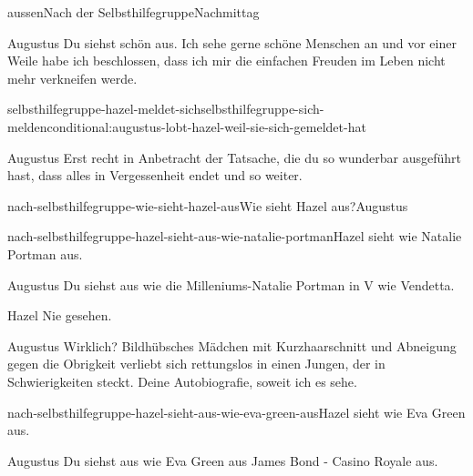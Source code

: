 \documentclass[12pt]{article}
\begin{document}
\begin{scene}[cut to]{aussen}{Nach der Selbsthilfegruppe}{Nachmittag}
        \begin{dialog}{Augustus}
            Du siehst schön aus.
            Ich sehe gerne schöne Menschen an und vor einer Weile habe ich beschlossen, dass ich mir die einfachen Freuden im Leben nicht mehr verkneifen werde.
        \end{dialog}


        \begin{conditional}{selbsthilfegruppe-hazel-meldet-sich}{selbsthilfegruppe-sich-melden}{conditional:augustus-lobt-hazel-weil-sie-sich-gemeldet-hat}
            \begin{dialog}{Augustus}
                Erst recht in Anbetracht der Tatsache, die du so wunderbar ausgeführt hast, dass alles in Vergessenheit endet und so weiter.
            \end{dialog}
        \end{conditional}

        \begin{decision}{nach-selbsthilfegruppe-wie-sieht-hazel-aus}{Wie sieht \gls{Hazel} aus?}{\gls{Augustus}}
            \begin{option}{nach-selbsthilfegruppe-hazel-sieht-aus-wie-natalie-portman}{\gls{Hazel} sieht wie Natalie Portman aus.}
                \begin{dialog}{Augustus}
                    Du siehst aus wie die Milleniums-Natalie Portman in V wie Vendetta.
                \end{dialog}

                \begin{dialog}{Hazel}
                    Nie gesehen.
                \end{dialog}

                \begin{dialog}{Augustus}
                    Wirklich?
                    Bildhübsches Mädchen mit Kurzhaarschnitt und Abneigung gegen die Obrigkeit verliebt sich rettungslos in einen Jungen, der in Schwierigkeiten steckt.
                    Deine Autobiografie, soweit ich es sehe.
                \end{dialog}
            \end{option}
            \begin{option}{nach-selbsthilfegruppe-hazel-sieht-aus-wie-eva-green-aus}{\gls{Hazel} sieht wie Eva Green aus.}
                \begin{dialog}{Augustus}
                    Du siehst aus wie Eva Green aus James Bond - Casino Royale aus.
                \end{dialog}


\end{option}
\end{decision}
\end{scene}
\end{document}
